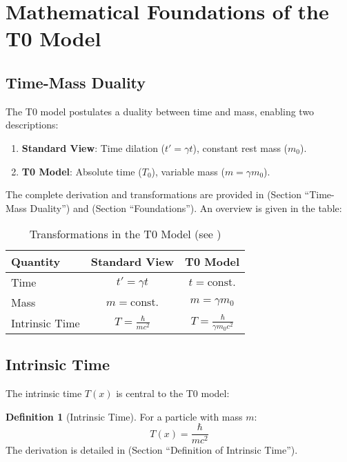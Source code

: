 \documentclass[a4paper,12pt]{article}
\theoremstyle{definition}
\newtheorem{definition}{Definition}[theorem]
\theoremstyle{remark}
\newcommand{\Tfield}{T(x)}
\begin{document}
	\section{Mathematical Foundations of the T0 Model}
	
	\subsection{Time-Mass Duality}
	
	The T0 model postulates a duality between time and mass, enabling two descriptions:
	\begin{enumerate}
		\item \textbf{Standard View}: Time dilation (\(t' = \gamma t\)), constant rest mass (\(m_0\)).
		\item \textbf{T0 Model}: Absolute time (\(T_0\)), variable mass (\(m = \gamma m_0\)).
	\end{enumerate}
	The complete derivation and transformations are provided in \cite{pascher_params_2025} (Section “Time-Mass Duality”) and \cite{pascher_galaxies_2025} (Section “Foundations”). An overview is given in the table:
	
	\begin{table}[h]
		\centering
		\begin{tabular}{|l|c|c|}
			\hline
			\textbf{Quantity} & \textbf{Standard View} & \textbf{T0 Model} \\
			\hline
			Time & \(t' = \gamma t\) & \(t = \text{const.}\) \\
			Mass & \(m = \text{const.}\) & \(m = \gamma m_0\) \\
			Intrinsic Time & \(T = \frac{\hbar}{m c^2}\) & \(T = \frac{\hbar}{\gamma m_0 c^2}\) \\
			\hline
		\end{tabular}
		\caption{Transformations in the T0 Model (see \cite{pascher_params_2025})}
	\end{table}
	
	\subsection{Intrinsic Time}
	
	The intrinsic time \(\Tfield\) is central to the T0 model:
	
	\begin{definition}[Intrinsic Time]
		For a particle with mass \(m\):
		\begin{equation}
			\Tfield = \frac{\hbar}{m c^2}
		\end{equation}
		The derivation is detailed in \cite{pascher_params_2025} (Section “Definition of Intrinsic Time”).
	\end{definition}
	
\end{document}
